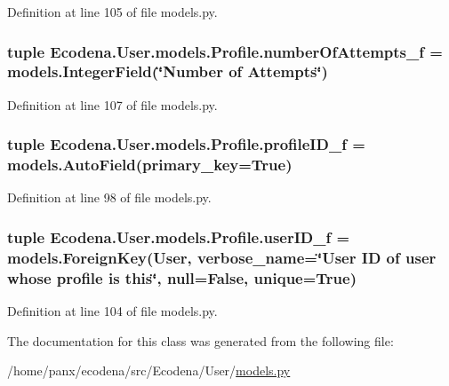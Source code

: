 Definition at line 105 of file models.py.

\hypertarget{class_ecodena_1_1_user_1_1models_1_1_profile_a7cfe404d70a33ce89be1a5d51c9cafba}{
\subsubsection[{numberOfAttempts\_\-f}]{\setlength{\rightskip}{0pt plus 5cm}tuple {\bf Ecodena.User.models.Profile.numberOfAttempts\_\-f} = models.IntegerField(\char`\"{}Number of Attempts\char`\"{})}}
\label{d2/de8/class_ecodena_1_1_user_1_1models_1_1_profile_a7cfe404d70a33ce89be1a5d51c9cafba}


Definition at line 107 of file models.py.

\hypertarget{class_ecodena_1_1_user_1_1models_1_1_profile_ae4b22732124303ac690d9d6347f8888b}{
\subsubsection[{profileID\_\-f}]{\setlength{\rightskip}{0pt plus 5cm}tuple {\bf Ecodena.User.models.Profile.profileID\_\-f} = models.AutoField(primary\_\-key=True)}}
\label{d2/de8/class_ecodena_1_1_user_1_1models_1_1_profile_ae4b22732124303ac690d9d6347f8888b}


Definition at line 98 of file models.py.

\hypertarget{class_ecodena_1_1_user_1_1models_1_1_profile_a2459a7c3980469d894a491c4aa5e72e1}{
\subsubsection[{userID\_\-f}]{\setlength{\rightskip}{0pt plus 5cm}tuple {\bf Ecodena.User.models.Profile.userID\_\-f} = models.ForeignKey(User, verbose\_\-name=\char`\"{}User ID of user whose profile is this\char`\"{}, null=False, unique=True)}}
\label{d2/de8/class_ecodena_1_1_user_1_1models_1_1_profile_a2459a7c3980469d894a491c4aa5e72e1}


Definition at line 104 of file models.py.



The documentation for this class was generated from the following file:\begin{DoxyCompactItemize}
\item 
/home/panx/ecodena/src/Ecodena/User/\hyperlink{_user_2models_8py}{models.py}\end{DoxyCompactItemize}
